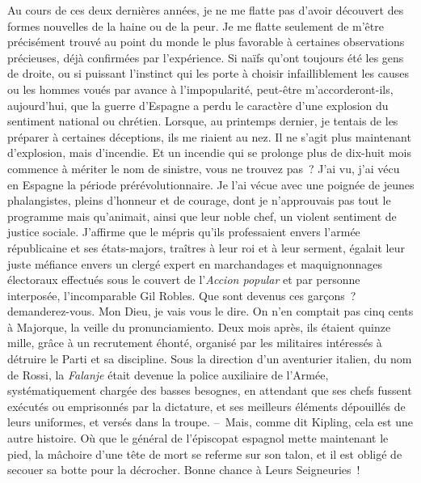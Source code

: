 \documentclass[french,twoside]{book} %
\newcommand{\astertri}{\medskip\par\centerline{\color{rubric}\large\selectfont{\syms ✻\,✻\,✻}}\medskip\par}%
\begin{document}
\astertri

\noindent Au cours de ces deux dernières années, je ne me flatte pas d’avoir découvert des formes nouvelles de la haine ou de la peur. Je me flatte seulement de m’être précisément trouvé au point du monde le plus favorable à certaines observations précieuses, déjà confirmées par l’expérience. Si naïfs qu’ont toujours été les gens de droite, ou si puissant l’instinct qui les porte à choisir infailliblement les causes ou les hommes voués par avance à l’impopularité, peut-être m’accorderont-ils, aujourd’hui, que la guerre d’Espagne a perdu le caractère d’une explosion du sentiment national ou chrétien. Lorsque, au printemps dernier, je tentais de les préparer à certaines déceptions, ils me riaient au nez. Il ne s’agit plus maintenant d’explosion, mais d’incendie. Et un incendie qui se prolonge plus de dix-huit mois commence à mériter le nom de sinistre, vous ne trouvez pas ? J’ai vu, j’ai vécu en Espagne la période prérévolutionnaire. Je l’ai vécue avec une poignée de jeunes phalangistes, pleins d’honneur et de courage, dont je n’approuvais pas tout le programme mais qu’animait, ainsi que leur noble chef, un violent sentiment de justice sociale. J’affirme que le mépris qu’ils professaient envers l’armée républicaine et ses états-majors, traîtres à leur roi et à leur serment, égalait leur juste méfiance envers un clergé expert en marchandages et maquignonnages électoraux effectués sous le couvert de l’\emph{Accion popular} et par personne interposée, l’incomparable Gil Robles. Que sont devenus ces garçons ? demanderez-vous. Mon Dieu, je vais vous le dire. On n’en comptait pas cinq cents à Majorque, la veille du pronunciamiento. Deux mois après, ils étaient quinze mille, grâce à un recrutement éhonté, organisé par les militaires intéressés à détruire le Parti et sa discipline. Sous la direction d’un aventurier italien, du nom de Rossi, la \emph{Falanje} était devenue la police auxiliaire de l’Armée, systématiquement chargée des basses besognes, en attendant que ses chefs fussent exécutés ou emprisonnés par la dictature, et ses meilleurs éléments dépouillés de leurs uniformes, et versés dans la troupe. – Mais, comme dit Kipling, cela est une autre histoire. Où que le général de l’épiscopat espagnol mette maintenant le pied, la mâchoire d’une tête de mort se referme sur son talon, et il est obligé de secouer sa botte pour la décrocher. Bonne chance à Leurs Seigneuries !\par

\astertri
\end{document}
